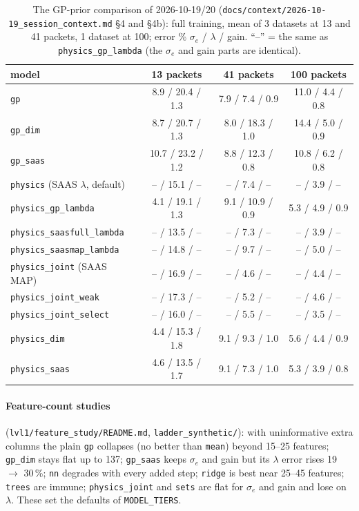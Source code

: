 \documentclass[10pt]{article}
\newcommand{\code}[1]{\texttt{#1}}
\newcommand{\se}{\sigma_e}
\begin{document}
\begin{table}[H]
\centering\small
\begin{tabular}{lccc}
\toprule
model & 13 packets & 41 packets & 100 packets \\
\midrule
\code{gp} & 8.9 / 20.4 / 1.3 & 7.9 / 7.4 / 0.9 & 11.0 / 4.4 / 0.8 \\
\code{gp\_dim} & 8.7 / 20.7 / 1.3 & 8.0 / 18.3 / 1.0 & 14.4 / 5.0 / 0.9 \\
\code{gp\_saas} & 10.7 / 23.2 / 1.2 & 8.8 / 12.3 / 0.8 & 10.8 / 6.2 / 0.8 \\
\code{physics} (SAAS $\lambda$, default) & -- / 15.1 / -- & -- / 7.4 / -- & -- / 3.9 / -- \\
\code{physics\_gp\_lambda} & 4.1 / 19.1 / 1.3 & 9.1 / 10.9 / 0.9 & 5.3 / 4.9 / 0.9 \\
\code{physics\_saasfull\_lambda} & -- / 13.5 / -- & -- / 7.3 / -- & -- / 3.9 / -- \\
\code{physics\_saasmap\_lambda} & -- / 14.8 / -- & -- / 9.7 / -- & -- / 5.0 / -- \\
\code{physics\_joint} (SAAS MAP) & -- / 16.9 / -- & -- / 4.6 / -- & -- / 4.4 / -- \\
\code{physics\_joint\_weak} & -- / 17.3 / -- & -- / 5.2 / -- & -- / 4.6 / -- \\
\code{physics\_joint\_select} & -- / 16.0 / -- & -- / 5.5 / -- & -- / 3.5 / -- \\
\code{physics\_dim} & 4.4 / 15.3 / 1.8 & 9.1 / 9.3 / 1.0 & 5.6 / 4.4 / 0.9 \\
\code{physics\_saas} & 4.6 / 13.5 / 1.7 & 9.1 / 7.3 / 1.0 & 5.3 / 3.9 / 0.8 \\
\bottomrule
\end{tabular}
\caption{The GP-prior comparison of 2026-10-19/20 (\code{docs/context/2026-10-19\_session\_context.md} \S4 and \S4b):
full training, mean of 3 datasets at 13 and 41 packets, 1 dataset at 100; error \% $\se$ / $\lambda$ / gain. ``--'' =
the same as \code{physics\_gp\_lambda} (the $\se$ and gain parts are identical).}
\end{table}

\paragraph{Feature-count studies} (\code{lvl1/feature\_study/README.md}, \code{ladder\_synthetic/}): with
uninformative extra columns the plain \code{gp} collapses (no better than \code{mean}) beyond 15--25 features; \code{gp\_dim}
stays flat up to 137; \code{gp\_saas} keeps $\se$ and gain but its $\lambda$ error rises 19 $\to$ 30\,\%; \code{nn}
degrades with every added step; \code{ridge} is best near 25--45 features; \code{trees} are immune; \code{physics\_joint}
and \code{sets} are flat for $\se$ and gain and lose on $\lambda$. These set the defaults of \code{MODEL\_TIERS}.
\end{document}
